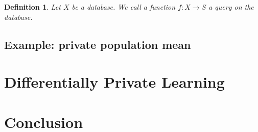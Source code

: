 \documentclass{icopust}
\newtheorem{defn}{Definition}
\begin{document}
\begin{defn}
    Let $X$ be a database.
    We call a function $f : X \to S$ a \emph{query} on the database.
\end{defn}

\subsection{Example: private population mean}

\section{Differentially Private Learning}



\section{Conclusion}


\clearpage



\end{document}
